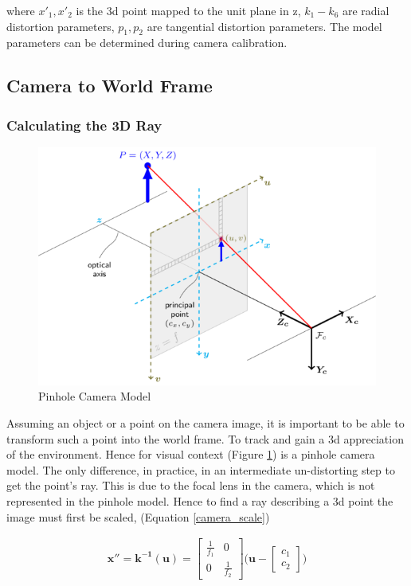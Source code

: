 \documentclass[a4paper,11pt,notitlepage]{article}
\begin{document}
where $x'_{1},x'_{2}$ is the 3d point mapped to the unit plane in z, $k_{1}-k_{6}$ are radial distortion parameters, $p_{1},p_{2}$ are tangential distortion parameters. The model parameters can be determined during camera calibration.


\subsection{Camera to World Frame} \label{cam2world}

\subsubsection{Calculating the 3D Ray}

\noindent \begin{figure}[h!]
	\includegraphics[width = 1.0\hsize]{figures/pinhole_camera_model.png}
	\caption{Pinhole Camera Model}
	\label{pinhole_model}
\end{figure}

Assuming an object or a point on the camera image, it is important to be able to transform such a point into the world frame. To track and gain a 3d appreciation of the environment. Hence for visual context (Figure \ref{pinhole_model}) is a pinhole camera model. The only difference, in practice, in an intermediate un-distorting step to get the point's ray. This is due to the focal lens in the camera, which is not represented in the pinhole model. Hence to find a ray describing a 3d point the image must first be scaled, (Equation \ref{camera_scale})


\begin{equation}
\begin{aligned}
\mathbf{x''} = \mathbf{k^{-1}(u)} = 
\begin{bmatrix}
\frac{1}{f_{1}} & 0 \\[0.3em]
0 & \frac{1}{f_{2}}
\end{bmatrix}
\bigg (
\mathbf{u} -
\begin{bmatrix}
c_{1} \\[0.3em]
c_{2}
\end{bmatrix}
\bigg )
\end{aligned}
\label{camera_scale}
\end{equation}
\end{document}
